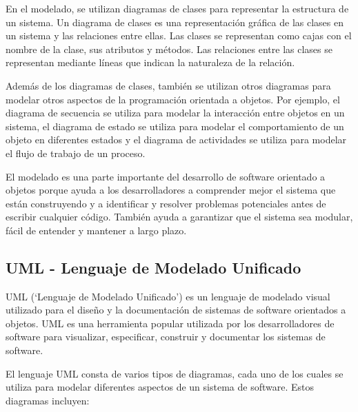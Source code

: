 \documentclass[executivepaper]{article}
\begin{document}
En el modelado, se utilizan diagramas de clases para representar la estructura de un sistema. Un diagrama de clases es una representación gráfica de las clases en un sistema y las relaciones entre ellas. Las clases se representan como cajas con el nombre de la clase, sus atributos y métodos. Las relaciones entre las clases se representan mediante líneas que indican la naturaleza de la relación.

Además de los diagramas de clases, también se utilizan otros diagramas para modelar otros aspectos de la programación orientada a objetos. Por ejemplo, el diagrama de secuencia se utiliza para modelar la interacción entre objetos en un sistema, el diagrama de estado se utiliza para modelar el comportamiento de un objeto en diferentes estados y el diagrama de actividades se utiliza para modelar el flujo de trabajo de un proceso.

El modelado es una parte importante del desarrollo de software orientado a objetos porque ayuda a los desarrolladores a comprender mejor el sistema que están construyendo y a identificar y resolver problemas potenciales antes de escribir cualquier código. También ayuda a garantizar que el sistema sea modular, fácil de entender y mantener a largo plazo.

\subsection*{UML - Lenguaje de Modelado Unificado}
UML (\enquote*{Lenguaje de Modelado Unificado}) es un lenguaje de modelado visual utilizado para el diseño y la documentación de sistemas de software orientados a objetos. UML es una herramienta popular utilizada por los desarrolladores de software para visualizar, especificar, construir y documentar los sistemas de software.

El lenguaje UML consta de varios tipos de diagramas, cada uno de los cuales se utiliza para modelar diferentes aspectos de un sistema de software. Estos diagramas incluyen:
\end{document}
